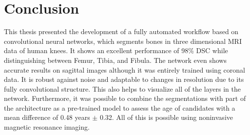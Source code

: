 \section{Conclusion}

This thesis presented the development of a fully automated workflow based on convolutional neural networks, which segments bones in three dimensional MRI data of human knees. It shows an excellent performance of 98\% DSC while distinguishing between Femur, Tibia, and Fibula. The network even shows accurate results on sagittal images although it was entirely trained using coronal data. It is robust against noise and adaptable to changes in resolution due to its fully convolutional structure. This also helps to visualize all of the layers in the network. Furthermore, it was possible to combine the segmentations with part of the architecture as a pre-trained model to assess the age of candidates with a mean difference of 0.48 years $\pm$ 0.32. All of this is possible using noninvasive magnetic resonance imaging.

\newpage